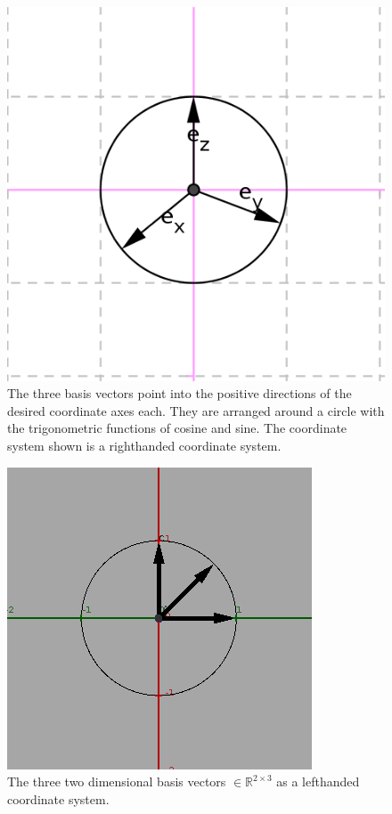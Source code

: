 \documentclass[a4paper]{article}
\begin{document}
\begin{figure}[ht]
\includegraphics[scale=1]{unitvectors.png}
\caption{The three basis vectors point into the positive directions of the desired coordinate axes each. They are arranged around a circle with the trigonometric functions of cosine and sine. The coordinate system shown is a righthanded coordinate system.}
\end{figure}

\begin{figure}[ht]\includegraphics[scale=0.5]{lefthandbasis.png}
\caption{The three two dimensional basis vectors $\in \mathbb{R}^{2\times{3}}$ as a lefthanded coordinate system.}
\end{figure}
\end{document}
